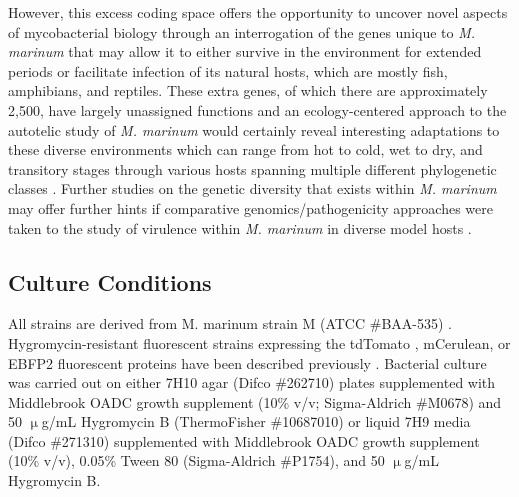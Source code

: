 However, this excess coding space offers the opportunity to uncover novel aspects of mycobacterial biology through an interrogation of the genes unique to \textit{M. marinum} that may allow it to either survive in the environment for extended periods or facilitate infection of its natural hosts, which are mostly fish, amphibians, and reptiles. These extra genes, of which there are approximately 2,500, have largely unassigned functions and an ecology\hyp{}centered approach to the autotelic study of \textit{M. marinum} would certainly reveal interesting adaptations to these diverse environments which can range from hot to cold, wet to dry, and transitory stages through various hosts spanning multiple different phylogenetic classes \citep{Stinear2000, Stamm2004}. Further studies on the genetic diversity that exists within \textit{M. marinum} may offer further hints if comparative genomics/pathogenicity approaches were taken to the study of virulence within \textit{M. marinum} in diverse model hosts \citep{Das2018}.

\subsection{Culture Conditions}\label{marcult}

All strains are derived from M. marinum strain M (ATCC \#BAA\hyp{}535) \citep{Ramakrishnan1994}. Hygromycin\hyp{}resistant fluorescent strains expressing the tdTomato \citep{Oehlers2015} , mCerulean, or EBFP2 fluorescent proteins have been described previously \citep{Takaki2013}. Bacterial culture was carried out on either 7H10 agar (Difco \#262710) plates supplemented with Middlebrook OADC growth supplement (10\% v/v; Sigma\hyp{}Aldrich \#M0678) and 50 $\upmu$g/mL Hygromycin B (ThermoFisher \#10687010) or liquid 7H9 media (Difco \#271310) supplemented with Middlebrook OADC growth supplement (10\% v/v), 0.05\% Tween 80 (Sigma\hyp{}Aldrich \#P1754), and 50 $\upmu$g/mL Hygromycin B. 

